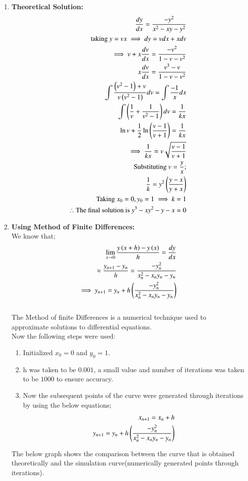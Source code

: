 \documentclass[journal]{IEEEtran}
\begin{document}
\begin{enumerate}
    \item \textbf{Theoretical Solution:}\\ 
    \begin{align}
    \frac{dy}{dx}=\frac{-y^2}{x^2-xy-y^2}\\
    \text{taking $y=vx$}\implies dy=vdx+xdv\\
    \implies v+x\frac{dv}{dx}=\frac{-v^2}{1-v-v^2}\\
    x\frac{dv}{dx}=\frac{v^3-v}{1-v-v^2}\\
    \int\frac{\left(v^2-1\right)+v}{v\left(v^2-1\right)}dv=\int\frac{-1}{x}dx\\
    \int\left(\frac{1}{v}+\frac{1}{v^2-1}\right)dv=\frac{1}{kx}\\
    \ln{v}+\frac{1}{2}\ln{\ensuremath{\left(\frac{v-1}{v+1}\right)}}=\frac{1}{kx}\\
    \implies \frac{1}{kx}=v\sqrt{\frac{v-1}{v+1}}\\
    \text{Substituting $v=\frac{y}{x}$};\\
    \frac{1}{k}=y^2\left(\frac{y-x}{y+x}\right)\\
    \text{Taking $x_0=0, y_0=1$}\implies k=1\\
    \therefore \text{The final solution is $y^3-xy^2-y-x=0$}
    \end{align}
    \item \textbf{Using Method of Finite Differences:}\\ We know that;\\
    \begin{align}
        \lim_{x\to 0}\frac{y\left(x+h\right)-y\left(x\right)}{h}=\frac{dy}{dx}\\
        \approx \frac{y_{n+1}-y_n}{h}=\frac{-y_n^2}{x_n^2-x_ny_n-y_n}\\
        \implies y_{n+1}=y_n+h\left(\frac{-y_n^2}{x_n^2-x_ny_n-y_n}\right)
    \end{align}
    \\The Method of finite Differences is a numerical technique used to approximate solutions to differential equations.\\
    Now the following steps were used:
    \begin{enumerate}
        \item Initialized $x_0=0$ and $y_0=1$.
        \item h was taken to be $0.001$, a small value and number of iterations was taken to be $1000$ to ensure accuracy.
        \item Now the subsequent points of the curve were generated through iterations by using the below equations;
        \begin{align}
            x_{n+1}=x_n+h\\
            y_{n+1}=y_n+h\left(\frac{-y_n^2}{x_n^2-x_ny_n-y_n}\right)
        \end{align}
    \end{enumerate}
    The below graph shows the comparison between the curve that is obtained theoretically and the simulation curve(numerically generated points through iterations).
\end{enumerate}
\end{document}
